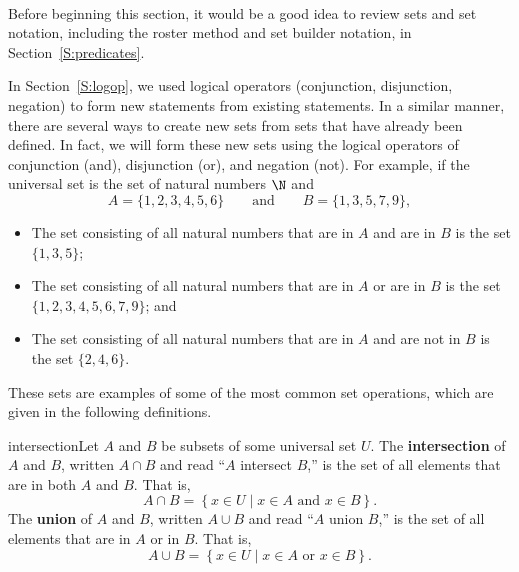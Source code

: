 \begin{previewactivity}\label{PA:setops} \hfill \\
Before beginning this section, it would be a good idea to review sets and set notation, including the roster method and set builder notation, in Section~\ref{S:predicates}.

In Section~\ref{S:logop}, we used logical operators (conjunction, disjunction, negation) to form new statements from existing statements.  In a similar manner, there are several ways to create new sets from sets that have already been defined.  In fact, we will form these new sets using the logical operators of conjunction (and), disjunction (or), and negation (not).  For example, if the universal set is the set of natural numbers $\N$ and 
\[
A = \{ 1, 2, 3, 4, 5, 6 \} \qquad \text{and} \qquad B = \{ 1, 3, 5, 7, 9 \},
\]
\begin{itemize}
  \item The set consisting of all natural numbers that are in $A$ and are in $B$ is the set $\{1, 3, 5 \}$;
  \item The set consisting of all natural numbers that are in $A$ or are in $B$ is the set 
         $\{ 1, 2, 3, 4, 5, 6, 7, 9 \}$; and
  \item The set consisting of all natural numbers that are in $A$ and are not in $B$ is the set 
         $\{ 2, 4, 6 \}$.
\end{itemize}
These sets are examples of some of the most common set operations, which are given in the following definitions.
\begin{defbox}{intersection}{Let  $A$  and  $B$ be subsets of some universal set  $U$\!.  
The \textbf{intersection}
%
%
of  $A$  and  $B$, written  $A \cap B$ and read ``$A$ intersect $B$,''  is the set of all elements that are in both  $A$  and  $B$.  That is,
\[
A \cap B = \left\{ {x \in U} \mid {x \in A \text{  and  } x \in B}  \right\}\!.
\] 
\label{sym:intersect}
The \textbf{union}
%
%
of  $A$  and  $B$, written  $A \cup B$ and read ``$A$ union $B$,'' is the set of all elements that are in  $A$  or in  $B$.  That is,
\[
A \cup B = \left\{ {x \in U} \mid {x \in A \text{  or  } x \in B}  \right\}.
\]} 
\label{sym:union}
\end{defbox}


\end{previewactivity}
